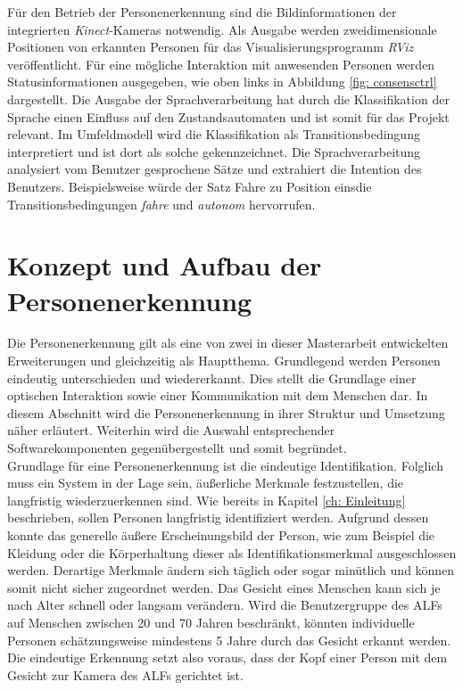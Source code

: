 	Für den Betrieb der Personenerkennung sind die Bildinformationen der integrierten \textit{Kinect}-Kameras notwendig. Als Ausgabe werden zweidimensionale Positionen von erkannten Personen für das Visualisierungsprogramm \textit{RViz} veröffentlicht. Für eine mögliche Interaktion mit anwesenden Personen werden Statusinformationen  ausgegeben, wie oben links in Abbildung \ref{fig: consensctrl} dargestellt. Die Ausgabe der Sprachverarbeitung hat durch die Klassifikation der Sprache einen Einfluss auf den Zustandsautomaten und ist somit für das Projekt relevant. Im Umfeldmodell wird die Klassifikation als Transitionsbedingung interpretiert und ist dort als solche gekennzeichnet. Die Sprachverarbeitung analysiert vom Benutzer gesprochene Sätze und extrahiert die Intention des Benutzers. Beispielsweise würde der Satz \glqq Fahre zu Position eins\grqq die Transitionsbedingungen \textit{fahre} und \textit{autonom} hervorrufen. \\
		
	
	
	
	
	\section{Konzept und Aufbau der Personenerkennung}
	\label{sec: Konzept Personenerkennung}
	
	Die Personenerkennung gilt als eine von zwei in dieser Masterarbeit entwickelten Erweiterungen und gleichzeitig als Hauptthema. Grundlegend werden Personen eindeutig unterschieden und wiedererkannt. Dies stellt die Grundlage einer optischen Interaktion sowie einer Kommunikation mit dem Menschen dar. In diesem Abschnitt wird die Personenerkennung in ihrer Struktur und Umsetzung näher erläutert. Weiterhin wird die Auswahl entsprechender Softwarekomponenten gegenübergestellt und somit begründet.\\
	
	Grundlage für eine Personenerkennung ist die eindeutige Identifikation. Folglich muss ein System in der Lage sein, äußerliche Merkmale festzustellen, die langfristig wiederzuerkennen sind. Wie bereits in Kapitel \ref{ch: Einleitung} beschrieben, sollen Personen langfristig identifiziert werden. Aufgrund dessen konnte das generelle äußere Erscheinungsbild der Person, wie zum Beispiel die Kleidung oder die Körperhaltung dieser als Identifikationsmerkmal ausgeschlossen werden. Derartige Merkmale ändern sich täglich oder sogar minütlich und können somit nicht sicher zugeordnet werden. Das Gesicht eines Menschen kann sich je nach Alter schnell oder langsam verändern. Wird die Benutzergruppe des ALFs auf Menschen zwischen 20 und 70 Jahren beschränkt, könnten individuelle Personen schätzungsweise mindestens 5 Jahre durch das Gesicht erkannt werden. Die eindeutige Erkennung setzt also voraus, dass der Kopf einer Person mit dem Gesicht zur Kamera des ALFs gerichtet ist. \\ 
	
